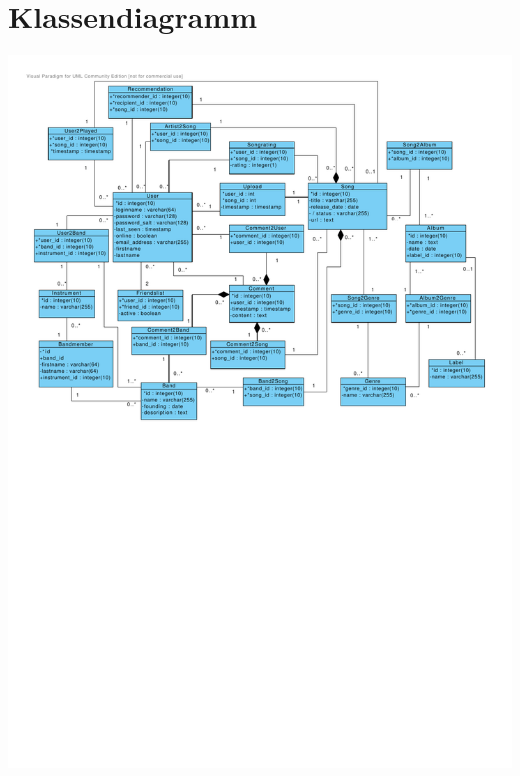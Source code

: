 \documentclass[11pt,a4paper,DIV=9]{scrartcl}
\begin{document}
\section{Klassendiagramm}
\includegraphics[page=1, angle=90,trim=0cm 0cm 1.1cm 1cm, clip=true, scale=1.1]{Diagram1}
\end{document}
